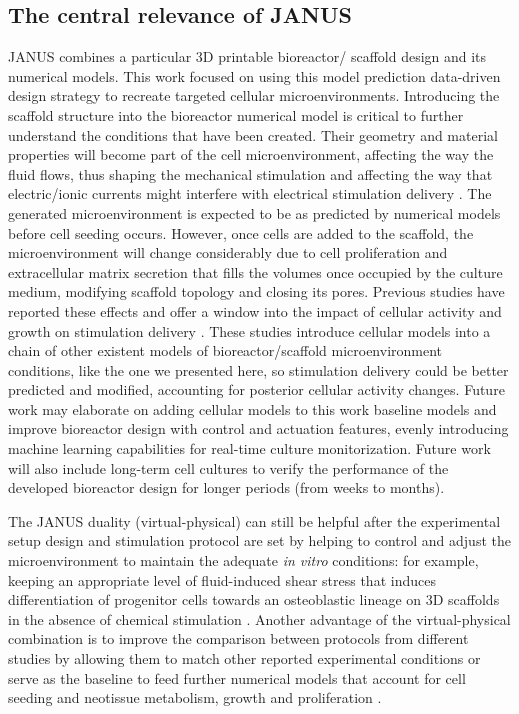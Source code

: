 \subsection{The central relevance of JANUS}
JANUS combines a particular 3D printable bioreactor/ scaffold design and its numerical models. This work focused on using this model prediction data-driven design strategy to recreate targeted cellular microenvironments. Introducing the scaffold structure into the bioreactor numerical model is critical to further understand the conditions that have been created. Their geometry and material properties will become part of the cell microenvironment, affecting the way the fluid flows, thus shaping the mechanical stimulation \cite{Capuana2023-ik, Moradkhani2021-qf, Zhao2018-ci, Zhao2020-pa} and affecting the way that electric/ionic currents might interfere with electrical stimulation delivery \cite{Meneses2021-nd}. The generated microenvironment is expected to be as predicted by numerical models before cell seeding occurs. However, once cells are added to the scaffold, the microenvironment will change considerably due to cell proliferation and extracellular matrix secretion that fills the volumes once occupied by the culture medium, modifying scaffold topology and closing its pores. Previous studies have reported these effects and offer a window into the impact of cellular activity and growth on stimulation delivery \cite{Zhao2020-pa, Perier-Metz2021-bj}. These studies introduce cellular models into a chain of other existent models of bioreactor/scaffold microenvironment conditions, like the one we presented here, so stimulation delivery could be better predicted and modified, accounting for posterior cellular activity changes. Future work may elaborate on adding cellular models to this work baseline models and improve bioreactor design with control and actuation features, evenly introducing machine learning capabilities for real-time culture monitorization. Future work will also include long-term cell cultures to verify the performance of the developed bioreactor design for longer periods (from weeks to months). 

The JANUS duality (virtual-physical) can still be helpful after the experimental setup design and stimulation protocol are set by helping to control and adjust the microenvironment to maintain the adequate \textit{in vitro} conditions: for example, keeping an appropriate level of fluid-induced shear stress that induces differentiation of progenitor cells towards an osteoblastic lineage on 3D scaffolds in the absence of chemical stimulation \cite{Yamada2021-qf}. Another advantage of the virtual-physical combination is to improve the comparison between protocols from different studies by allowing them to match other reported experimental conditions or serve as the baseline to feed further numerical models that account for cell seeding and neotissue metabolism, growth and proliferation \cite{Reina-Romo2019-ry}.


